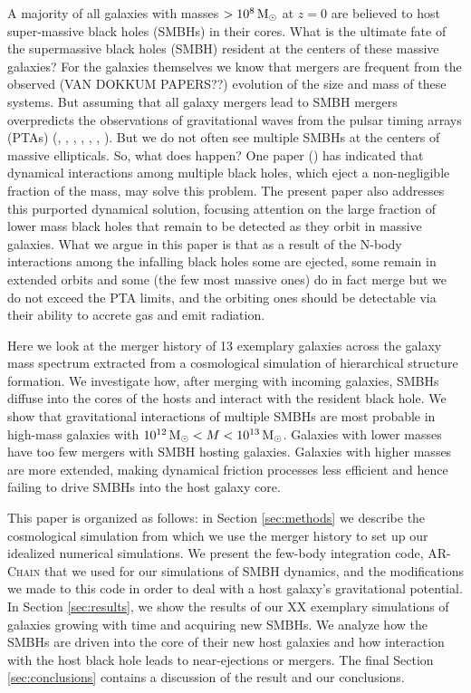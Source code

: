 \documentclass[english, apj]{emulateapj}
\newcommand{\msun}{\mbox{$\,{\rm M}_\odot$}}
\begin{document}
A majority of all galaxies with masses $>10^8\msun$ at $z=0$ are believed to host super-massive black holes (SMBHs) in their cores.  What is the ultimate fate of the supermassive black holes (SMBH) resident at the centers of these massive galaxies?  For the galaxies themselves we know that mergers are frequent from the observed (VAN DOKKUM PAPERS??) evolution of the size and mass of these systems.  But assuming that all galaxy mergers lead to SMBH mergers overpredicts the observations of gravitational waves from the pulsar timing arrays (PTAs) (\citet{2015ApJ...799..178K}, \citet{2014ApJ...789..156M}, \citet{2008MNRAS.390..192S}, \citet{2013MNRAS.433L...1S}, \citet{2018ApJ...856...42S}, \citet{2009MNRAS.394.2255S}, \citet{2018arXiv180403143I}).  But we do not often see multiple SMBHs at the centers of massive ellipticals.  So, what does happen?  One paper (\citet{2018MNRAS.473.3410R}) has indicated that dynamical interactions among multiple black holes, which eject a non-negligible fraction of the mass, may solve this problem.  The present paper also addresses this purported dynamical solution, focusing attention on the large fraction of lower mass black holes that remain to be detected as they orbit in massive galaxies.  What we argue in this paper is that as a result of the N-body interactions among the infalling black holes some are ejected, some remain in extended orbits and some (the few most massive ones) do in fact merge but we do not exceed the PTA limits, and the orbiting ones should be detectable via their ability to accrete gas and emit radiation.

Here we look at the merger history of 13 exemplary galaxies across the galaxy mass spectrum extracted from a cosmological simulation of hierarchical structure formation. We investigate how, after merging with incoming galaxies, SMBHs diffuse into the cores of the hosts and interact with the resident black hole. We show that gravitational interactions of multiple SMBHs are most probable in high-mass galaxies with $10^{12} \msun < M < 10^{13} \msun$. Galaxies with lower masses have too few mergers with SMBH hosting galaxies. Galaxies with higher masses are more extended, making dynamical friction processes less efficient and hence failing to drive SMBHs into the host galaxy core.

This paper is organized as follows: in Section \ref{sec:methods} we describe the cosmological simulation from which we use the merger history to set up our idealized numerical simulations. We present the few-body integration code, \textsc{AR-Chain} that we used for our simulations of SMBH dynamics, and the modifications we made to this code in order to deal with a host galaxy's gravitational potential. In Section \ref{sec:results}, we show the results of our XX exemplary simulations of galaxies growing with time and acquiring new SMBHs. We analyze how the SMBHs are driven into the core of their new host galaxies and how interaction with the host black hole leads to near-ejections or mergers. The final Section \ref{sec:conclusions} contains a discussion of the result and our conclusions.
\end{document}
